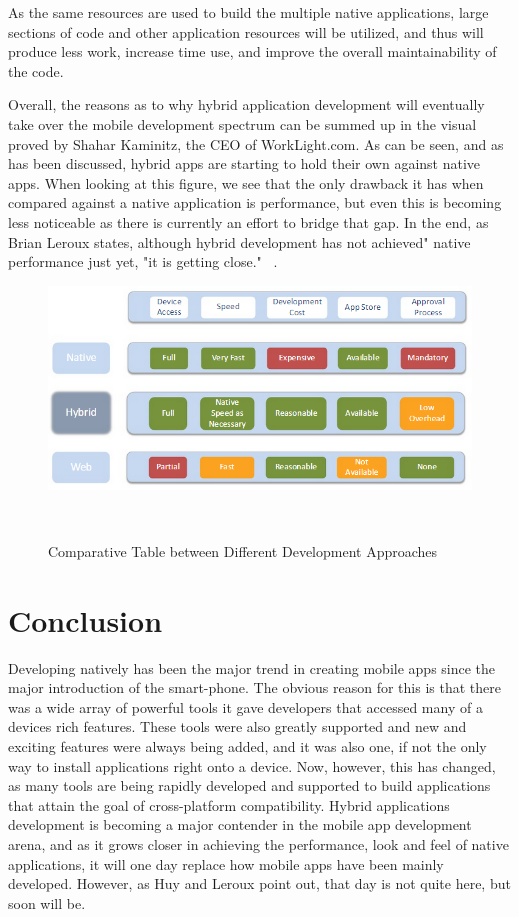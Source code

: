 \documentclass[11pt, twocolumn]{article}
\begin{document}
As the same resources are used to build the multiple native applications, large sections of code and other application resources will be utilized, and thus will produce less work, increase time use, and improve the overall maintainability of the code.

Overall, the reasons as to why hybrid application development will eventually take over the mobile development spectrum can be summed up in the visual proved by Shahar Kaminitz, the CEO of WorkLight.com. As can be seen, and as has been discussed, hybrid apps are starting to hold their own against native apps. When looking at this figure, we see that the only drawback it has when compared against a native application is performance, but even this is becoming less noticeable as there is currently an effort to bridge that gap.  In the end, as Brian Leroux states, although hybrid development has not achieved" native performance just yet, "it is getting close." ~\cite{Leroux2011}.

\begin{figure}[h]
\includegraphics[scale=0.5]{ComparativeTable}
\caption{Comparative Table between Different Development Approaches} ~\cite{Kaminitz2012}
\end{figure}

\section{Conclusion}
Developing natively has been the major trend in creating mobile apps since the major introduction of the smart-phone.  The obvious reason for this is that there was a wide array of powerful tools it gave developers that accessed many of a devices rich features.  These tools were also greatly supported and new and exciting features were always being added, and it was also one, if not the only way to install applications right onto a device.  Now, however, this has changed, as many tools are being rapidly developed and supported to build applications that attain the goal of cross-platform compatibility.  Hybrid applications development is becoming a major contender in the mobile app development arena, and as it grows closer in achieving the performance, look and feel of native applications, it will one day replace how mobile apps have been mainly developed.  However, as Huy and Leroux point out, that day is not quite here, but soon will be. ~\cite{Huy2012} ~\cite{Leroux2011}\\
\end{document}
